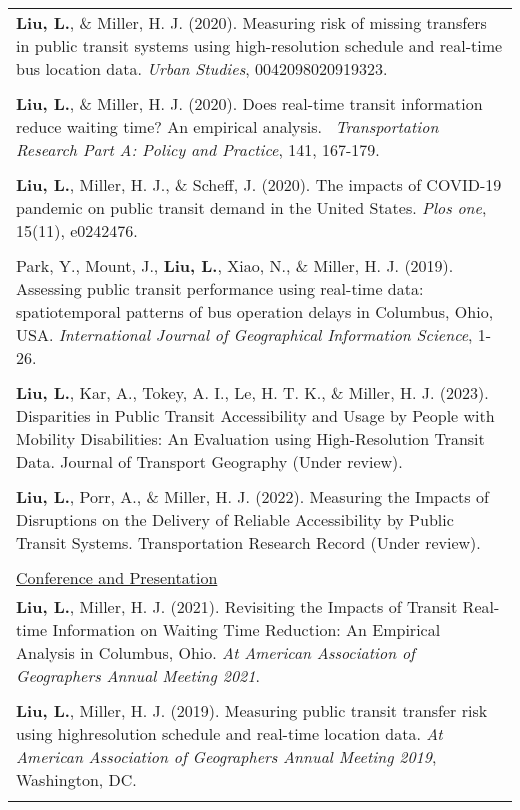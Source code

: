 \documentclass[letterpaper, 11pt]{article}
\begin{document}
\begin{longtable}{p{6.5in}}
\textbf{Liu, L.}, \& Miller, H. J. (2020). Measuring risk of missing transfers in public transit systems using high-resolution schedule and real-time bus location data. \textit{Urban Studies}, 0042098020919323.\\\\

\textbf{Liu, L.}, \&  Miller, H. J. (2020). Does real-time transit information reduce waiting time? An empirical analysis.  \textit{Transportation Research Part A: Policy and Practice}, 141, 167-179.\\\\

\textbf{Liu, L.}, Miller, H. J., \& Scheff, J. (2020). The impacts of COVID-19 pandemic on public transit demand in the United States. \textit{Plos one}, 15(11), e0242476.\\\\

Park, Y., Mount, J., \textbf{Liu, L.}, Xiao, N., \& Miller, H. J. (2019). Assessing public transit performance using real-time data: spatiotemporal patterns of bus operation delays in Columbus, Ohio, USA. \textit{International Journal of Geographical Information Science}, 1-26.\\\\

\textbf{Liu, L.}, Kar, A., Tokey, A. I., Le, H. T. K., \& Miller, H. J. (2023). Disparities in Public Transit Accessibility and Usage by People with Mobility Disabilities: An Evaluation using High-Resolution Transit Data. Journal of Transport Geography (Under review).\\\\


\textbf{Liu, L.}, Porr, A., \& Miller, H. J. (2022). Measuring the Impacts of Disruptions on the Delivery of Reliable Accessibility by Public Transit Systems. Transportation Research Record (Under review).\\\\

\underline{Conference and Presentation} \\
\textbf{Liu, L.}, Miller, H. J. (2021). Revisiting the Impacts of Transit Real-time Information on Waiting Time Reduction: An Empirical Analysis in Columbus, Ohio. \textit{At American Association of Geographers Annual Meeting 2021}.	\\\\

\textbf{Liu, L.}, Miller, H. J. (2019). Measuring public transit transfer risk using highresolution schedule and real-time location data. \textit{At American Association of Geographers Annual Meeting 2019}, Washington, DC. \\\\


\end{longtable}
\end{document}
